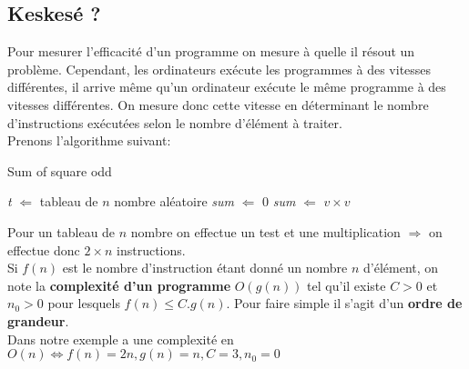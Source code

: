 \documentclass[11pt]{extarticle}
\begin{document}
\subsection{Keskesé ?}
Pour mesurer l'efficacité d'un programme on mesure à quelle il résout un problème. Cependant, les ordinateurs exécute les programmes à des vitesses différentes, il arrive même qu'un ordinateur exécute le même programme à des vitesses différentes. On mesure donc cette vitesse en déterminant le nombre d'instructions exécutées selon le nombre d'élément à traiter.\\
Prenons l'algorithme suivant:
\begin{center}
\begin{algorithm}
\caption{Sum of square odd}\label{sum_of_square_odd}
\begin{algorithmic} %
    \State \textit{t} $\Leftarrow $ tableau de $n$ nombre aléatoire
    \State \textit{sum} $\Leftarrow $ 0
            	\State \textit{sum} $\Leftarrow $ $v \times v$
			\EndIf            
    \EndFor
\end{algorithmic}
\end{algorithm}
\end{center}
Pour un tableau de $n$ nombre on effectue un test et une multiplication $\Rightarrow$ on effectue donc $2 \times n$ instructions. \\
Si $f(n)$ est le nombre d'instruction étant donné un nombre $n$ d'élément, on note la \textbf{complexité d'un programme} $O(g(n))$ tel qu'il existe $C > 0$ et $n_0 > 0$ pour lesquels $f(n) \leq C.g(n)$. Pour faire simple il s'agit d'un \textbf{ordre de grandeur}. \\
Dans notre exemple a une complexité en $O(n) \Leftrightarrow f(n)=2n, g(n)=n, C=3, n_0=0$\\
\newpage
\end{document}
